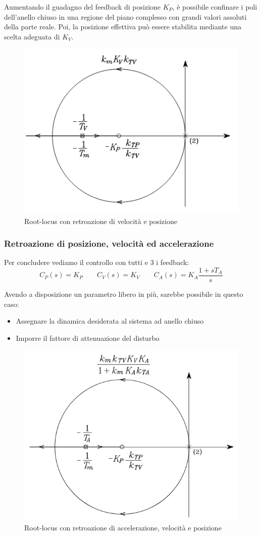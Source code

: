 Aumentando il guadagno del feedback di posizione $K_P$, è possibile confinare i poli dell'anello chiuso in una regione del piano complesso con grandi valori assoluti della parte reale. Poi, la posizione effettiva può essere stabilita mediante una scelta adeguata di $K_V$.

\begin{figure}[!ht]
	\centering
	\includegraphics[width=0.5\linewidth]{images/root_locus_2}
	\caption{Root-locus con retroazione di velocità e posizione}
	\label{fig:rootlocus2}
\end{figure}







\vspace{35pt}
\subsubsection{Retroazione di posizione, velocità ed accelerazione}

Per concludere vediamo il controllo con tutti e 3 i feedback:
$$
C_P(s) = K_P \qquad C_V(s)=K_V \qquad C_A(s)=K_A\frac{1+sT_A}{s}
$$

Avendo a disposizione un parametro libero in più, sarebbe
possibile in questo caso:
\begin{itemize}
	\item Assegnare la dinamica desiderata al sistema ad anello chiuso
	\item Imporre il fattore di attenuazione del disturbo
\end{itemize}


\begin{figure}[ht!]
	\centering
	\includegraphics[width=0.5\linewidth]{images/root_locus_3}
	\caption{Root-locus con retroazione di accelerazione, velocità e posizione}
	\label{fig:rootlocus3}
\end{figure}

